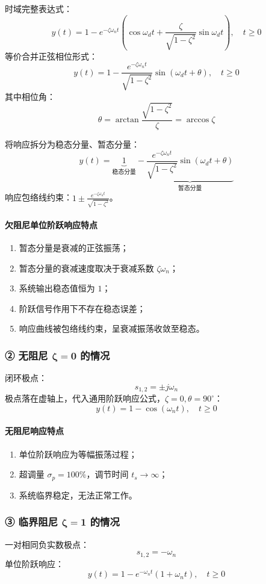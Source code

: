 时域完整表达式：
\[
y(t)=1-e^{-\zeta\omega_n t}\left(\cos\omega_d t+\frac{\zeta}{\sqrt{1-\zeta^2}}\sin\omega_d t\right),\quad t\ge0
\]
等价合并正弦相位形式：
\[
y(t)=1-\frac{e^{-\zeta\omega_n t}}{\sqrt{1-\zeta^2}}\sin\left(\omega_d t+\theta\right),\quad t\ge0
\]
其中相位角：
\[
\theta=\arctan\frac{\sqrt{1-\zeta^2}}{\zeta}=\arccos\zeta
\]

将响应拆分为稳态分量、暂态分量：
\[
y(t)=\underbrace{1}_{\text{稳态分量}}-\underbrace{\frac{e^{-\zeta\omega_n t}}{\sqrt{1-\zeta^2}}\sin\left(\omega_d t+\theta\right)}_{\text{暂态分量}}
\]
响应包络线约束：$\displaystyle 1\pm \frac{e^{-\zeta\omega_n t}}{\sqrt{1-\zeta^2}}$。

\paragraph{欠阻尼单位阶跃响应特点}
\begin{enumerate}
    \item 暂态分量是衰减的正弦振荡；
    \item 暂态分量的衰减速度取决于衰减系数 $\zeta\omega_n$；
    \item 系统输出稳态值恒为 $1$；
    \item 阶跃信号作用下不存在稳态误差；
    \item 响应曲线被包络线约束，呈衰减振荡收敛至稳态。
\end{enumerate}

\subsubsection{② 无阻尼 $\boldsymbol{\zeta=0}$ 的情况}
闭环极点：
\[
s_{1,2}=\pm j\omega_n
\]
极点落在虚轴上，代入通用阶跃响应公式，$\zeta=0,\theta=90^\circ$：
\[
y(t)=1-\cos\left(\omega_n t\right),\quad t\ge0
\]

\paragraph{无阻尼响应特点}
\begin{enumerate}
    \item 单位阶跃响应为等幅振荡过程；
    \item 超调量 $\sigma_p=100\%$，调节时间 $t_s\to\infty$；
    \item 系统临界稳定，无法正常工作。
\end{enumerate}

\subsubsection{③ 临界阻尼 $\boldsymbol{\zeta=1}$ 的情况}
一对相同负实数极点：
\[
s_{1,2}=-\omega_n
\]
单位阶跃响应：
\[
y(t)=1-e^{-\omega_n t}\left(1+\omega_n t\right),\quad t\ge0
\]

